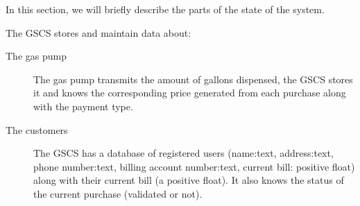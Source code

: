 In this section, we will briefly describe the parts of the state of the
system. \newline

The GSCS stores and maintain data about:

\begin{description}
    \item[The gas pump] The gas pump transmits the amount of gallons dispensed,
    the GSCS stores it and knows the corresponding price generated from
    each purchase along with the payment type.

    \item[The customers] The GSCS has a database of registered users
    (name:text, address:text, phone number:text, billing account number:text,
    current bill: positive float) along with their current bill (a positive
    float). It also knows the status of the current purchase (validated or not).
\end{description}
